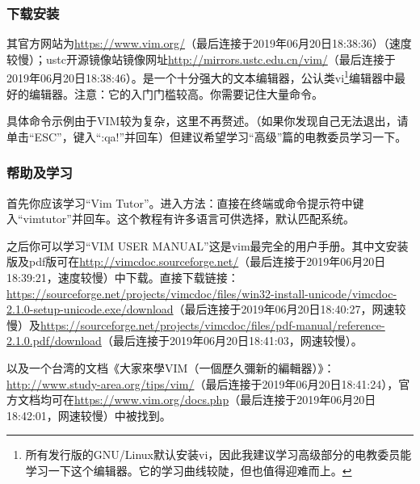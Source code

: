 \documentclass{book}
\begin{document}
\subsubsection{下载安装}
其官方网站为\url{https://www.vim.org/}（最后连接于2019年06月20日18:38:36）（速度较慢）；ustc开源镜像站镜像网址\url{http://mirrors.ustc.edu.cn/vim/}（最后连接于2019年06月20日18:38:46）。是一个十分强大的文本编辑器，公认类vi\footnote{所有发行版的GNU/Linux默认安装vi，因此我建议学习高级部分的电教委员能学习一下这个编辑器。它的学习曲线较陡，但也值得迎难而上。}编辑器中最好的编辑器。注意：它的入门门槛较高。你需要记住大量命令。\par
具体命令示例由于VIM较为复杂，这里不再赘述。（如果你发现自己无法退出，请单击“ESC”，键入“:qa!”并回车）但建议希望学习“高级”篇的电教委员学习一下。
\subsubsection{帮助及学习}
首先你应该学习“Vim Tutor”。进入方法：直接在终端或命令提示符中键入“vimtutor”并回车。这个教程有许多语言可供选择，默认匹配系统。\par
之后你可以学习“VIM USER MANUAL”这是vim最完全的用户手册。其中文安装版及pdf版可在\url{http://vimcdoc.sourceforge.net/}（最后连接于2019年06月20日18:39:21，速度较慢）中下载。直接下载链接：\url{https://sourceforge.net/projects/vimcdoc/files/win32-install-unicode/vimcdoc-2.1.0-setup-unicode.exe/download}（最后连接于2019年06月20日18:40:27，网速较慢）及\url{https://sourceforge.net/projects/vimcdoc/files/pdf-manual/reference-2.1.0.pdf/download}（最后连接于2019年06月20日18:41:03，网速较慢）。\par
以及一个台湾的文档《大家來學VIM（一個歷久彌新的編輯器）》：\url{http://www.study-area.org/tips/vim/}（最后连接于2019年06月20日18:41:24），官方文档均可在\url{https://www.vim.org/docs.php}（最后连接于2019年06月20日18:42:01，网速较慢）中被找到。
\end{document}

